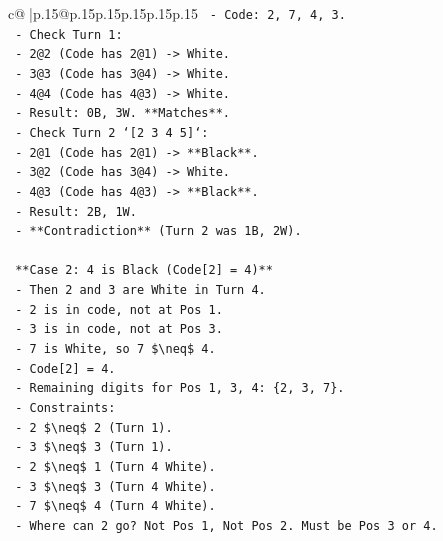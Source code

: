 \documentclass{article}
\begin{document}
{\begin{supertabular}{c@{$\;$}|p{.15\linewidth}@{}p{.15\linewidth}p{.15\linewidth}p{.15\linewidth}p{.15\linewidth}p{.15\linewidth}}
{{{\texttt{          {-} Code: 2, 7, 4, 3.} \\
\texttt{          {-} Check Turn 1:} \\
\texttt{            {-} 2@2 (Code has 2@1) {-}> White.} \\
\texttt{            {-} 3@3 (Code has 3@4) {-}> White.} \\
\texttt{            {-} 4@4 (Code has 4@3) {-}> White.} \\
\texttt{            {-} Result: 0B, 3W. **Matches**.} \\
\texttt{          {-} Check Turn 2 `{[}2 3 4 5{]}`:} \\
\texttt{            {-} 2@1 (Code has 2@1) {-}> **Black**.} \\
\texttt{            {-} 3@2 (Code has 3@4) {-}> White.} \\
\texttt{            {-} 4@3 (Code has 4@3) {-}> **Black**.} \\
\texttt{            {-} Result: 2B, 1W.} \\
\texttt{            {-} **Contradiction** (Turn 2 was 1B, 2W).} \\
\\ 
\texttt{        **Case 2: 4 is Black (Code{[}2{]} = 4)**} \\
\texttt{        {-} Then 2 and 3 are White in Turn 4.} \\
\texttt{          {-} 2 is in code, not at Pos 1.} \\
\texttt{          {-} 3 is in code, not at Pos 3.} \\
\texttt{        {-} 7 is White, so 7 \$\textbackslash{}neq\$ 4.} \\
\texttt{        {-} Code{[}2{]} = 4.} \\
\texttt{        {-} Remaining digits for Pos 1, 3, 4: \{2, 3, 7\}.} \\
\texttt{        {-} Constraints:} \\
\texttt{          {-} 2 \$\textbackslash{}neq\$ 2 (Turn 1).} \\
\texttt{          {-} 3 \$\textbackslash{}neq\$ 3 (Turn 1).} \\
\texttt{          {-} 2 \$\textbackslash{}neq\$ 1 (Turn 4 White).} \\
\texttt{          {-} 3 \$\textbackslash{}neq\$ 3 (Turn 4 White).} \\
\texttt{          {-} 7 \$\textbackslash{}neq\$ 4 (Turn 4 White).} \\
\texttt{        {-} Where can 2 go? Not Pos 1, Not Pos 2. Must be Pos 3 or 4.} \\
}}}
\end{supertabular}}
\end{document}
